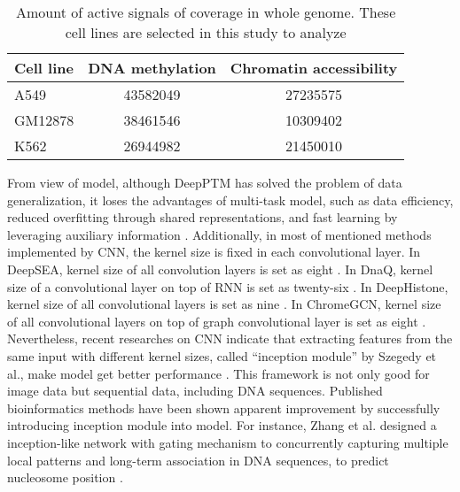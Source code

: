\begin{table}[H]%
    \centering
    \begin{tabular}{lcc}
        \hline
        Cell line &  DNA methylation & Chromatin accessibility \\\hline
        A549 & 43582049 & 27235575 \\
        GM12878 & 38461546 & 10309402 \\
        K562 & 26944982 & 21450010 \\\hline
    \end{tabular}
    \renewcommand{\baselinestretch}{1.0}
    \captionsetup{labelfont=bf}
    \caption[Amount of active signals of coverage in whole genome]{Amount of active signals of coverage in whole genome. These cell lines are selected in this study to analyze}
    \label{t2}
\end{table}

From view of model, although DeepPTM has solved the problem of data generalization, it loses the advantages of multi-task model, such as data efficiency, reduced overfitting through shared representations, and fast learning by leveraging auxiliary information \cite{crawshaw2020multi}. Additionally, in most of mentioned methods implemented by CNN, the kernel size is fixed in each convolutional layer. In DeepSEA, kernel size of all convolution layers is set as eight \cite{zhou2015predicting}. In DnaQ, kernel size of a convolutional layer on top of RNN is set as twenty-six \cite{quang2016danq}. In DeepHistone, kernel size of all convolutional layers is set as nine \cite{yin2019deephistone}. In ChromeGCN, kernel size of all convolutional layers on top of graph convolutional layer is set as eight \cite{lanchantin2020graph}. Nevertheless, recent researches on CNN indicate that extracting features from the same input with different kernel sizes, called “inception module” by Szegedy et al., make model get better performance \cite{szegedy2015going}\cite{tan2019mixconv}. This framework is not only good for image data but sequential data, including DNA sequences. Published bioinformatics methods have been shown apparent improvement by successfully introducing inception module into model. For instance, Zhang et al. designed a inception-like network with gating mechanism to concurrently capturing multiple local patterns and long-term association in DNA sequences, to predict nucleosome position \cite{zhang2018lenup}.